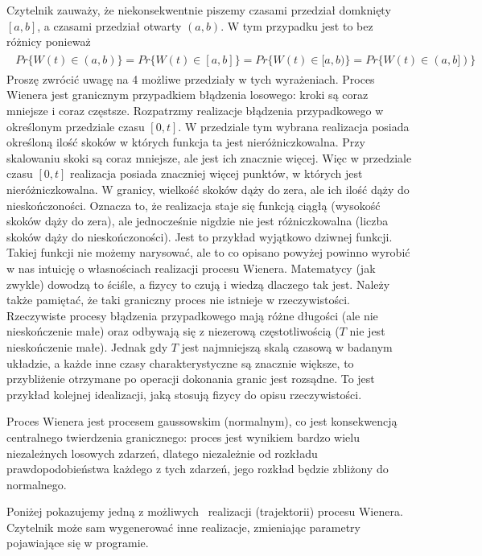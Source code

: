 \documentclass[a4paper,12pt,polish]{sphinxmanual}
\begin{document}
Czytelnik zauważy, że niekonsekwentnie piszemy czasami przedział domknięty $[a, b]$, a czasami przedział otwarty $(a, b)$. W tym przypadku jest to bez różnicy ponieważ
\label{ch3/chIII021:equation-eqn15}\begin{gather}
\begin{split}Pr\{W(t) \in (a, b)\} = Pr\{W(t) \in [a, b]\} = Pr\{W(t) \in [a, b)\} = Pr\{W(t) \in (a, b])\}\end{split}\label{ch3/chIII021-eqn15}
\end{gather}
Proszę zwrócić uwagę na 4 możliwe przedziały w tych wyrażeniach.
Proces Wienera jest granicznym przypadkiem błądzenia losowego: kroki są coraz mniejsze i coraz częstsze. Rozpatrzmy realizacje błądzenia przypadkowego w określonym przedziale czasu $[0, t]$. W przedziale tym wybrana realizacja posiada określoną ilość skoków w których funkcja ta jest nieróżniczkowalna. Przy skalowaniu skoki są coraz mniejsze, ale jest ich znacznie więcej. Więc w przedziale czasu $[0, t]$ realizacja posiada znaczniej więcej punktów, w których jest nieróżniczkowalna. W granicy, wielkość skoków dąży do zera, ale ich ilość dąży do nieskończoności. Oznacza to, że realizacja staje się funkcją ciągłą (wysokość skoków dąży do zera), ale jednocześnie nigdzie nie jest różniczkowalna (liczba skoków dąży do nieskończoności). Jest to przykład wyjątkowo dziwnej funkcji. Takiej funkcji nie możemy narysować, ale to co opisano powyżej powinno wyrobić w nas intuicję o własnościach realizacji procesu Wienera. Matematycy (jak zwykle) dowodzą to ściśle, a fizycy to czują i wiedzą dlaczego tak jest. Należy także pamiętać, że taki graniczny proces nie istnieje w rzeczywistości. Rzeczywiste procesy błądzenia przypadkowego mają różne długości (ale nie nieskończenie małe) oraz odbywają się z niezerową częstotliwością ($T$ nie jest nieskończenie małe). Jednak gdy $T$ jest najmniejszą skalą czasową w badanym układzie, a każde inne czasy charakterystyczne są znacznie większe, to przybliżenie otrzymane po operacji dokonania granic jest rozsądne. To jest przykład kolejnej idealizacji, jaką stosują fizycy do opisu rzeczywistości.

Proces Wienera jest procesem gaussowskim (normalnym), co jest konsekwencją centralnego twierdzenia granicznego: proces jest wynikiem bardzo wielu niezależnych losowych zdarzeń, dlatego niezależnie od rozkładu prawdopodobieństwa każdego z tych zdarzeń, jego rozkład będzie zbliżony do normalnego.

Poniżej pokazujemy jedną z możliwych  realizacji (trajektorii) procesu Wienera. Czytelnik może sam wygenerować inne realizacje, zmieniając parametry pojawiające się w programie.
\end{document}
